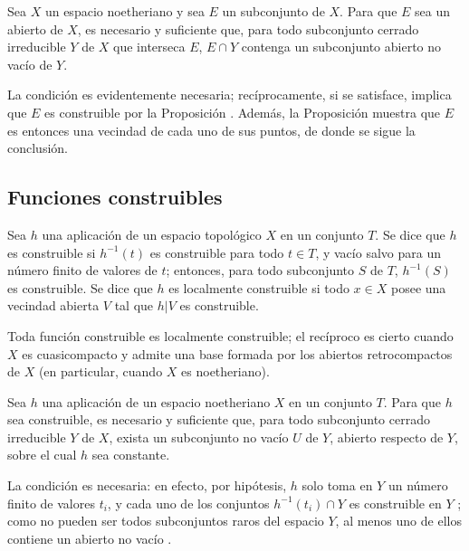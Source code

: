 \begin{corollary}[9.2.6]
\label{0.9.2.6}
\label{0.9.2.6-fr}
Sea $X$ un espacio noetheriano y sea $E$ un subconjunto de $X$.
Para que $E$ sea un abierto de $X$, es necesario y suficiente que, para todo subconjunto cerrado irreducible $Y$ de $X$ que interseca $E$, $E\cap Y$ contenga un subconjunto abierto no vacío de $Y$.
\end{corollary}


La condición es evidentemente necesaria; recíprocamente, si se satisface, implica que $E$ es construible por la Proposición .
Además, la Proposición  muestra que $E$ es entonces una vecindad de cada uno de sus puntos, de donde se sigue la conclusión.


\subsection{Funciones construibles}
\label{subsection:0.9.3}
\label{subsection:0.9.3-fr}

\begin{definition}[9.3.1]
\label{0.9.3.1}
\label{0.9.3.1-fr}
Sea $h$ una aplicación de un espacio topológico $X$ en un conjunto $T$.
Se dice que $h$ es construible si $h^{-1}(t)$ es construible para todo $t\in T$, y vacío salvo para un número finito de valores de $t$; entonces, para todo subconjunto $S$ de $T$, $h^{-1}(S)$ es construible.
Se dice que $h$ es localmente construible si todo $x\in X$ posee una vecindad abierta $V$ tal que $h|V$ es construible.
\end{definition}

Toda función construible es localmente construible; el recíproco es cierto cuando $X$ es cuasicompacto y admite una base formada por los abiertos retrocompactos de $X$ (en particular, cuando $X$ es noetheriano).

\begin{proposition}[9.3.2]
\label{0.9.3.2}
\label{0.9.3.2-fr}
Sea $h$ una aplicación de un espacio noetheriano $X$ en un conjunto $T$.
Para que $h$ sea construible, es necesario y suficiente que, para todo subconjunto cerrado irreducible $Y$ de $X$, exista un subconjunto no vacío $U$ de $Y$, abierto respecto de $Y$, sobre el cual $h$ sea constante.
\end{proposition}


La condición es necesaria: en efecto, por hipótesis, $h$ solo toma en $Y$ un número finito de valores $t_i$, y cada uno de los conjuntos
$h^{-1}(t_i)\cap Y$ es construible en $Y$ ; como no pueden ser todos subconjuntos raros del espacio $Y$, al menos uno de ellos contiene un abierto no vacío .

